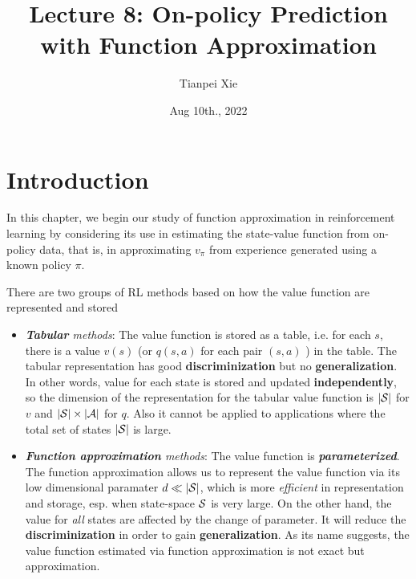 \documentclass[11pt]{article}
\begin{document}
\title{Lecture 8: On-policy Prediction with Function Approximation}
\author{Tianpei Xie}
\date{ Aug 10th., 2022 }
\maketitle
\tableofcontents
\newpage
\section{Introduction}
In this chapter, we begin our study of function approximation in reinforcement learning by considering its use in estimating the state-value function from on-policy data, that is,
in approximating $v_{\pi}$ from experience generated using a known policy $\pi$. 

There are two groups of RL methods based on how the value function are represented and stored
\begin{itemize}
\item \emph{\textbf{Tabular} methods}: The value function is stored as a table, i.e. for each $s$, there is a value $v(s)$ (or $q(s,a)$ for each pair $(s,a)$ ) in the table. The tabular representation has good \textbf{discriminization} but no \textbf{generalization}. In other words, value for each state is stored and updated \textbf{independently}, so the dimension of the representation for the tabular value function is $|{\mathcal S}|$ for $v$ and $|{\mathcal S}| \times |{\mathcal A}|$ for $q$. Also it cannot be applied to applications where the total set of states $|{\mathcal S}|$ is large. 

\item \emph{\textbf{Function approximation} methods}: The value function is \emph{\textbf{parameterized}}. The function approximation allows us to represent the value function via its low dimensional paramater $d \ll |{\mathcal S}| $, which is more \emph{efficient} in representation and storage, esp. when state-space ${\mathcal S}$ is very large. On the other hand, the value for \emph{all} states are affected by the change of parameter. It will reduce the  \textbf{discriminization} in order to gain \textbf{generalization}. As its name suggests, the value function estimated via function approximation is not exact but approximation.
\end{itemize}
\end{document}
